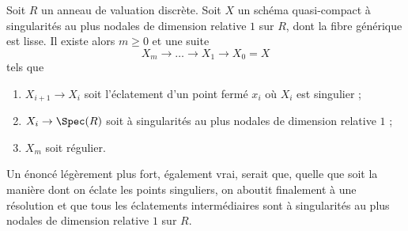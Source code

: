 \begin{lemma}
\label{lemma-blowup-at-worst-nodal}
Soit $R$ un anneau de valuation discrète. Soit $X$ un schéma quasi-compact
à singularités au plus nodales de dimension relative $1$ sur $R$, dont la
fibre générique est lisse. Il existe alors $m\geq0$ et une suite
$$
X_m \to \ldots \to X_1 \to X_0 = X
$$
tels que
\begin{enumerate}
\item $X_{i+1}\to X_i$ soit l'éclatement d'un point fermé $x_i$ où $X_i$
est singulier ;
\item $X_i\to\Spec(R)$ soit à singularités au plus nodales de dimension
relative $1$ ;
\item $X_m$ soit régulier.
\end{enumerate}
\end{lemma}

\noindent
Un énoncé légèrement plus fort, également vrai, serait que, quelle que soit
la manière dont on éclate les points singuliers, on aboutit finalement à
une résolution et que tous les éclatements intermédiaires sont à
singularités au plus nodales de dimension relative $1$ sur $R$.

